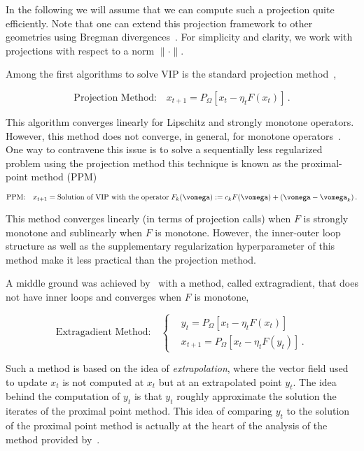 In the following we will assume that we can compute such a projection quite efficiently. Note that one can extend this projection framework to other geometries using Bregman divergences~\citep{bregman1967relaxation}. For simplicity and clarity, we work with projections with respect to a norm $\|\cdot\|$. 




Among the first algorithms to solve VIP is the standard projection method~\citep{sibony1970methodes},

\begin{equation}
\text{Projection Method:} \quad x_{t+1} = P_\Omega[x_t - \eta_t F(x_t)]\,.
\end{equation}

This algorithm converges linearly for Lipschitz and strongly monotone operators. However, this method does not converge, in general, for monotone operators~\citep{korpelevich1976extragradient}. One way to contravene this issue is to solve a sequentially less regularized problem using the projection method this technique is known as the proximal-point method (PPM)~\citep{martinet1970breve,rockafellar1976monotone}

\begin{equation}
\text{PPM:} \quad x_{t+1} = \text{Solution of VIP with the operator} \; F_k(\vomega) := c_k F(\vomega) + (\vomega -\vomega_k) \,.
\end{equation}

This method converges linearly (in terms of projection calls) when $F$ is strongly monotone and sublinearly when $F$ is monotone. However, the inner-outer loop structure as well as the supplementary regularization hyperparameter of this method make it less practical than the projection method. 




A middle ground was achieved by~\citet{korpelevich1976extragradient} with a method, called extragradient, that does not have inner loops and converges when $F$ is monotone,

\begin{equation}
\text{Extragadient Method:} \quad
\left\{\begin{aligned}
&y_t = P_\Omega[x_t - \eta_t F(x_t)] \\
&x_{t+1} = P_\Omega[x_t - \eta_t F(y_t)]\,.
\end{aligned} \right.
\end{equation}

Such a method is based on the idea of \emph{extrapolation}, where the vector field used to update $x_t$ is not computed at $x_t$ but at an extrapolated point $y_t$. The idea behind the computation of $y_t$ is that $y_t$ roughly approximate the solution the iterates of the proximal point method. This idea of comparing $y_t$ to the solution of the proximal point method is actually at the heart of the analysis of the method provided by~\citet{nemirovski_prox-method_2004}. 




